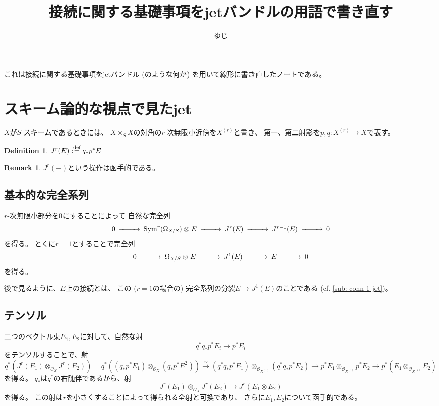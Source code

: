 \documentclass[uplatex]{jsarticle}
\title{接続に関する基礎事項をjetバンドルの用語で書き直す}
\author{ゆじ}
\theoremstyle{definition}
\newtheorem{defi}[defi]{Definition}
\newtheorem{rem}[rem]{Remark}
\newcommand{\dfn}{:\overset{\mbox{{\scriptsize def}}}{=}}
\newcommand{\Sym}{\mathrm{Sym}}
\newcommand{\mcO}{\mathcal{O}}
\begin{document}
\maketitle

これは接続に関する基礎事項をjetバンドル (のような何か) を用いて線形に書き直したノートである。




\section{スキーム論的な視点で見たjet}


\(X\)が\(S\)-スキームであるときには、
\(X\times_SX\)の対角の\(r\)-次無限小近傍を\(X^{(r)}\)と書き、
第一、第二射影を\(p,q:X^{(r)}\to X\)で表す。

\begin{defi}
  \(J^r(E) \dfn q_*p^*E\)
\end{defi}


\begin{rem}
  \(J^r(-)\)という操作は函手的である。
\end{rem}


\subsection{基本的な完全系列}

\(r\)-次無限小部分を\(0\)にすることによって
自然な完全列
\[
\begin{CD}
  0 @>>> \Sym^r(\Omega_{X/S}) \otimes E @>>> J^r(E) @>>> J^{r-1}(E) @>>> 0
\end{CD}
\]
を得る。
とくに\(r=1\)とすることで完全列
\[
\begin{CD}
  0 @>>> \Omega_{X/S} \otimes E @>>> J^1(E) @>>> E @>>> 0
\end{CD}
\]
を得る。

後で見るように、\(E\)上の接続とは、
この (\(r=1\)の場合の) 完全系列の分裂\(E\to J^1(E)\)のことである
(cf. \autoref{sub: conn 1-jet})。



\subsection{テンソル}

二つのベクトル束\(E_1,E_2\)に対して、自然な射
\[q^*q_*p^*E_i \to p^*E_i\]
をテンソルすることで、射
\[
q^*(J^r(E_1) \otimes_{\mcO_X} J^r(E_2))
= q^*((q_*p^*E_1) \otimes_{\mcO_X} (q_*p^*E^2)) \xrightarrow{\sim}
(q^*q_*p^*E_1)\otimes_{\mcO_{X^{(1)}}} (q^*q_*p^*E_2)
\to p^*E_1\otimes_{\mcO_{X^{(1)}}} p^*E_2
\to p^*(E_1\otimes_{\mcO_{X^{(1)}}} E_2)
\]
を得る。
\(q_*\)は\(q^*\)の右随伴であるから、射
\[
J^r(E_1) \otimes_{\mcO_X} J^r(E_2) \to J^r(E_1\otimes E_2)
\]
を得る。
この射は\(r\)を小さくすることによって得られる全射と可換であり、
さらに\(E_1,E_2\)について函手的である。
\end{document}
